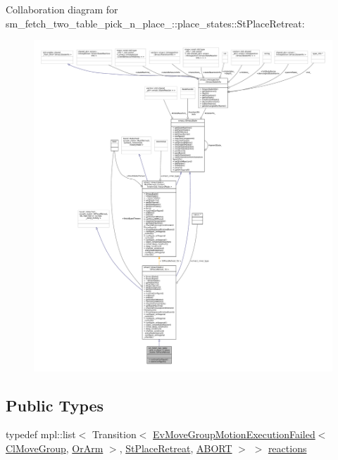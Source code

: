 Collaboration diagram for sm\+\_\+fetch\+\_\+two\+\_\+table\+\_\+pick\+\_\+n\+\_\+place\+\_\+:\+:place\+\_\+states\+:\+:St\+Place\+Retreat\+:
\nopagebreak
\begin{figure}[H]
\begin{center}
\leavevmode
\includegraphics[width=350pt]{structsm__fetch__two__table__pick__n__place__1_1_1place__states_1_1StPlaceRetreat__coll__graph}
\end{center}
\end{figure}
\subsection*{Public Types}
\begin{DoxyCompactItemize}
\item 
typedef mpl\+::list$<$ Transition$<$ \hyperlink{structcl__move__group__interface_1_1EvMoveGroupMotionExecutionFailed}{Ev\+Move\+Group\+Motion\+Execution\+Failed}$<$ \hyperlink{classcl__move__group__interface_1_1ClMoveGroup}{Cl\+Move\+Group}, \hyperlink{classsm__fetch__two__table__pick__n__place__1_1_1OrArm}{Or\+Arm} $>$, \hyperlink{structsm__fetch__two__table__pick__n__place__1_1_1place__states_1_1StPlaceRetreat}{St\+Place\+Retreat}, \hyperlink{classABORT}{A\+B\+O\+RT} $>$ $>$ \hyperlink{structsm__fetch__two__table__pick__n__place__1_1_1place__states_1_1StPlaceRetreat_a5848487ad7dae4dd59dde554eb9b1e85}{reactions}
\end{DoxyCompactItemize}
